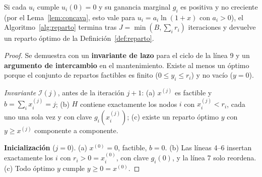 \begin{teorema}\label{teo:optimo}
Si cada $u_i$ cumple $u_i(0)=0$ y su ganancia marginal $g_i$ es positiva y no creciente (por el Lema~\ref{lem:concava}, esto vale para $u_i=a_i\ln(1+x)$ con $a_i>0$), el Algoritmo~\ref{alg:reparto} termina tras $J=\min(B,\sum_ir_i)$ iteraciones y devuelve un reparto óptimo de la Definición~\ref{def:reparto}.
\end{teorema}
\begin{proof}
Se demuestra con un \textbf{invariante de lazo} para el ciclo de la línea 9 y un \textbf{argumento de intercambio} en el mantenimiento. Existe al menos un óptimo porque el conjunto de repartos factibles es finito ($0\le y_i\le r_i$) y no vacío ($y=0$).

\emph{Invariante} $\mathcal{I}(j)$, antes de la iteración $j+1$:
(a) $x^{(j)}$ es factible y $b=\sum_ix_i^{(j)}=j$;
(b) $H$ contiene exactamente los nodos $i$ con $x_i^{(j)}<r_i$, cada uno una sola vez y con clave $g_i(x_i^{(j)})$;
(c) existe un reparto óptimo $y$ con $y\ge x^{(j)}$ componente a componente.

\textbf{Inicialización} ($j=0$). (a) $x^{(0)}=0$, factible, $b=0$. (b) Las líneas 4–6 insertan exactamente los $i$ con $r_i>0=x_i^{(0)}$, con clave $g_i(0)$, y la línea 7 solo reordena. (c) Todo óptimo $y$ cumple $y\ge0=x^{(0)}$.


\end{proof}
